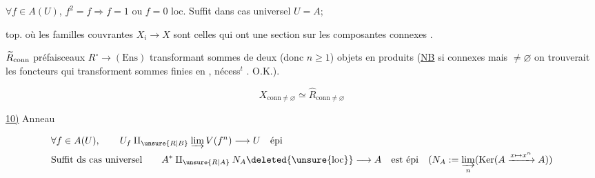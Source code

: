 $\forall f\in A(U)$, $f^2=f\Rightarrow f=1$ ou $f=0$ loc.
Suffit dans cas universel $U=A$;

top. où les familles couvrantes $X_i\to X$ sont celles qui ont une section sur les composantes connexes .


$\widetilde R_{\rm conn}$  préfaisceaux $R^\circ\to(\mathrm{Ens})$ transformant sommes
 de deux (donc $n\geq 1$) objets en produits
(\uline{NB} si  connexes  mais  $\ne\varnothing$
on trouverait les foncteurs  qui transforment sommes finies en , 
 nécess$^t$ . O.K.).

\[
 X_{\mathrm{conn}\ne\varnothing}\simeq\widehat R_{\mathrm{conn}\ne\varnothing}
\]

\uline{10)} Anneau  

\[
\begin{aligned}
 &\forall f\in A(U),\qquad U_f\amalg_{\unsure{R|B}}\varinjlim V(f^n)\longrightarrow U\quad\text{épi}\\
 &\text{Suffit ds cas universel}\qquad A^*\amalg_{\unsure{R|A}}N_A\deleted{\unsure{\rm loc}}
 \longrightarrow A\quad\text{est épi}\quad
 (N_A:=\varinjlim_n(\operatorname{Ker}(A\xrightarrow{x\mapsto x^n}A))
\end{aligned}
\]
